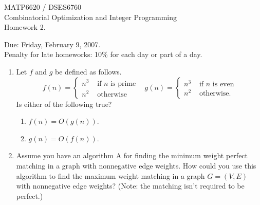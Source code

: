 \documentclass[12pt]{article}
\begin{document}
\begin{center}
  \begin{large}
     MATP6620 / DSES6760 \\ Combinatorial Optimization and Integer Programming \\
       Homework 2.
  \end{large}
\end{center}

\begin{flushright}
   Due:  Friday, February 9, 2007.  \\
Penalty for late homeworks: 10\% for each day or part of a day.
\end{flushright}


\begin{enumerate}
   \item  Let $f$ and $g$ be defined as follows.
          \begin{displaymath}
             f(n)  =  \left\{ \begin{array}{ll}
                                n^3 & \mbox{ if $n$ is prime}  \\
                                n^2 & \mbox{ otherwise}
                            \end{array}  \right.    \;\;\;
             g(n)  =  \left\{ \begin{array}{ll}
                                n^3 & \mbox{ if $n$ is even}  \\
                                n^2 & \mbox{ otherwise.}
                            \end{array}  \right.
           \end{displaymath}
           Is either of the following true?
           \begin{enumerate}
              \item  $f(n) = O(g(n))$.
              \item  $g(n) = O(f(n))$.
           \end{enumerate}
   \item
   Assume you have an algorithm A for finding the minimum weight perfect matching
   in a graph with nonnegative edge weights.
   How could you use this algorithm to find the maximum weight matching in
   a graph $G=(V,E)$ with nonnegative edge weights? (Note: the matching isn't required to be perfect.)

\end{enumerate}
\end{document}
